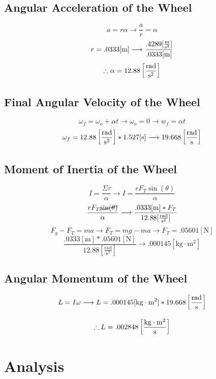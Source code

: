 \documentclass{article}
\begin{document}
\subsection{Angular Acceleration of the Wheel}

$$a = r \alpha \longrightarrow \frac{a}{r} = \alpha$$
$$r = .0333[\si{\meter}] \longrightarrow \frac{.4289[\si{\frac{\meter}{\square\second}}]}{.0333[\si{\meter}]}$$
$$\therefore \alpha = 12.88\left[\si{\frac{\radian}{\square\second}}\right]$$
\subsection{Final Angular Velocity of the Wheel}

$$\omega_f=\omega_o+\alpha t\longrightarrow \omega_o = 0 \longrightarrow w_f=\alpha t$$
$$\omega_f=12.88\left[\si{\frac{\radian}{\square\second}}\right]*1.527[\si{\second}]\longrightarrow 19.668\left[\si{\frac{\radian}{\second}}\right]$$

\subsection{Moment of Inertia of the Wheel}

$$I = \frac{\Sigma \tau}{\alpha}\longrightarrow I = \frac{rF_T \sin(\theta)}{\alpha}$$
$$\frac{rF_T\cancel{\sin(\theta)}}{\alpha}\longrightarrow\frac{.0333[\si{\meter}]*F_T}{12.88[\frac{\si{\radian}}{\si{\square\second}}]}$$
$$F_g-F_T=ma\longrightarrow F_T=mg-ma\longrightarrow F_T=.05601[\si{\newton}]$$
$$\frac{.0333[\si{\meter}]*.05601[\si{\newton}]}{12.88[\frac{\si{\radian}}{\si{\square\second}}]}\longrightarrow .000145[\si{\kilo\gram\cdot\square\meter}]$$

\subsection{Angular Momentum of the Wheel}

$$L = I\omega \longrightarrow L = .000145[\si{\kilo\gram\cdot\square\meter}] * 19.668\left[\si{\frac{\radian}{\second}}\right]$$

$$\therefore L = .002848\left[\si{\frac{\kilo\gram\cdot\square\meter}{\second}}\right]$$



\section{Analysis}
\end{document}
